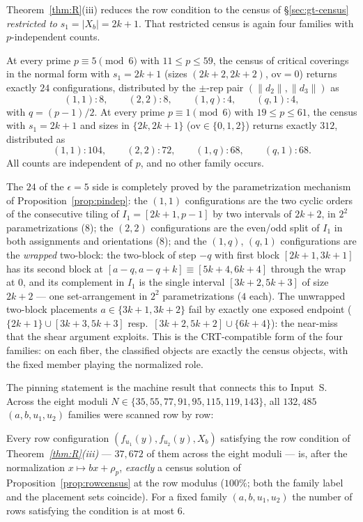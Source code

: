 Theorem~\ref{thm:R}(iii) reduces the row condition to the census of
\S\ref{sec:gt-census} \emph{restricted to} $s_1=|X_b|=2k+1$. That restricted
census is again four families with $p$-independent counts.

\begin{proposition}\label{prop:rowcensus}
At every prime $p\equiv5\pmod6$ with $11\le p\le59$, the census of critical
coverings in the normal form with $s_1=2k+1$ (sizes $(2k{+}2,2k{+}2)$,
$\mathrm{ov}=0$) returns exactly $24$ configurations, distributed by the
$\pm$-rep pair $(\|d_2\|,\|d_3\|)$ as
\[
(1,1):8,\qquad(2,2):8,\qquad(1,q):4,\qquad(q,1):4,
\]
with $q=(p-1)/2$. At every prime $p\equiv1\pmod6$ with $19\le p\le61$, the
census with $s_1=2k+1$ and sizes in $\{2k,2k+1\}$ ($\mathrm{ov}\in\{0,1,2\}$)
returns exactly $312$, distributed as
\[
(1,1):104,\qquad(2,2):72,\qquad(1,q):68,\qquad(q,1):68.
\]
All counts are independent of $p$, and no other family occurs.
\end{proposition}

The $24$ of the $\epsilon=5$ side is completely proved by the parametrization
mechanism of Proposition~\ref{prop:pindep}: the $(1,1)$ configurations are the two
cyclic orders of the consecutive tiling of $I_1=[2k+1,p-1]$ by two intervals
of $2k+2$, in $2^2$ parametrizations ($8$); the $(2,2)$ configurations are
the even/odd split of $I_1$ in both assignments and orientations ($8$); and
the $(1,q)$, $(q,1)$ configurations are the \emph{wrapped} two-block: the
two-block of step $-q$ with first block $[2k+1,3k+1]$ has its second block at
$[a-q,a-q+k]\equiv[5k+4,6k+4]$ through the wrap at $0$, and its complement
in $I_1$ is the single interval $[3k+2,5k+3]$ of size $2k+2$ --- one
set-arrangement in $2^2$ parametrizations ($4$ each). The unwrapped two-block
placements $a\in\{3k+1,3k+2\}$ fail by exactly one exposed endpoint
($\{2k+1\}\cup[3k{+}3,5k{+}3]$ resp.\ $[3k{+}2,5k{+}2]\cup\{6k{+}4\}$): the
near-miss that the shear argument exploits. This is the CRT-compatible form
of the four families: on each fiber, the classified objects are exactly the
census objects, with the fixed member playing the normalized role.

The pinning statement is the machine result that connects this to
Input~S. Across the eight moduli
$N\in\{35,55,77,91,95,115,119,143\}$, all $132{,}485$ $(a,b,u_1,u_2)$
families were scanned row by row:

\begin{proposition}[pinning at $N=pq$, machine]\label{prop:pqpinned}
Every row configuration $(f_{u_1}(y),f_{u_2}(y),X_b)$ satisfying the row
condition of Theorem~\emph{\ref{thm:R}(iii)} --- $37{,}672$ of them across
the eight moduli --- is, after the normalization $x\mapsto bx+\rho_p$,
\emph{exactly} a census solution of Proposition~\ref{prop:rowcensus} at the
row modulus ($100\%$; both the family label and the placement sets coincide).
For a fixed family $(a,b,u_1,u_2)$ the number of rows satisfying the
condition is at most $6$.
\end{proposition}


